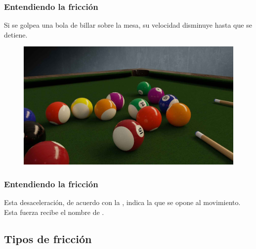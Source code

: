 \documentclass[14pt]{beamer}
\begin{document}
\begin{frame}
\frametitle{Entendiendo la fricción}
Si se golpea una bola de billar sobre la mesa, su velocidad disminuye hasta que se detiene.
\begin{figure}
    \centering
    \includegraphics[scale=0.15]{Imagenes/Friccion_01.jpg}
\end{figure}
\end{frame}
\begin{frame}
\frametitle{Entendiendo la fricción}
Esta desaceleración, de acuerdo con la , \pause indica la  que se opone al movimiento.
\\
\bigskip
\pause
Esta fuerza recibe el nombre de .
\end{frame}

\subsection{Tipos de fricción}
\end{document}
